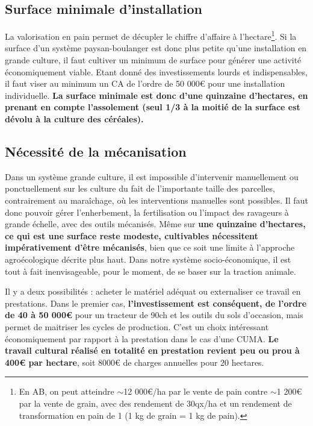 \documentclass{book}
\begin{document}
\subsection{Surface minimale d'installation}

La valorisation en pain permet de décupler le chiffre d'affaire à l'hectare\footnote{En AB, on peut atteindre $\sim$12 000\euro{}/ha par le vente de pain contre $\sim$1 200\euro{} par la vente de grain, avec des rendement de 30qx/ha et un rendement de transformation en pain de 1 (1 kg de grain = 1 kg de pain).}. Si la surface d'un système paysan-boulanger est donc plus petite qu'une installation en grande culture, il faut cultiver un minimum de surface pour générer une activité économiquement viable. Etant donné des investissements lourds et indispensables, il faut viser au minimum un CA de l'ordre de 50 000\euro{} pour une installation individuelle. \textbf{La surface minimale est donc d'une quinzaine d'hectares, en prenant en compte l'assolement (seul 1/3 à la moitié de la surface est dévolu à la culture des céréales).} 

\subsection{Nécessité de la mécanisation}

Dans un système grande culture, il est impossible d’intervenir manuellement ou ponctuellement sur les culture du fait de l’importante taille des parcelles, contrairement au maraîchage, où les interventions manuelles sont possibles. Il faut donc pouvoir gérer l’enherbement, la fertilisation ou l’impact des ravageurs à grande échelle, avec des outils mécanisés. Même sur \textbf{une quinzaine d'hectares, ce qui est une surface reste modeste, cultivables nécessitent impérativement d'être mécanisés}, bien que ce soit une limite à l'approche agroécologique décrite plus haut. Dans notre système socio-économique, il est tout à fait inenvisageable, pour le moment, de se baser sur la traction animale. 

Il y a deux possibilités : acheter le matériel adéquat ou externaliser ce travail en prestations. Dans le premier cas, \textbf{l'investissement est conséquent, de l'ordre de 40 à 50 000\euro{}} pour un tracteur de 90ch et les outils du sols d'occasion, mais permet de maitriser les cycles de production. C'est un choix intéressant économiquement par rapport à la prestation dans le cas d'une CUMA. \textbf{Le travail cultural réalisé en totalité en prestation revient peu ou prou à 400\euro{} par hectare}, soit 8000\euro{} de charges annuelles pour 20 hectares.
\end{document}
